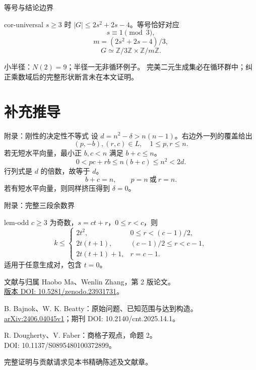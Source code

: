\documentclass{beamer}
\begin{document}
\begin{frame}{等号与结论边界}
\begin{bookresult}{cor-universal}
$s\ge3$ 时 $|G|\le2s^2+2s-4$。等号恰好对应
\[s\equiv1\pmod3,\]
\[m=(2s^2+2s-4)/3,\]
\[G\simeq\mathbb Z/3\mathbb Z\times\mathbb Z/m\mathbb Z.\]
\end{bookresult}
小半径：$N(2)=9$；半径一无非循环例子。
\medskip
完美二元生成集必在循环群中；纠正乘数域后的完整形状断言未在本文证明。
\end{frame}
\appendix
\section{补充推导}
\begin{frame}{附录：刚性的决定性不等式}
设 $d=n^2-\delta>n(n-1)$。右边外一列的覆盖给出
\[(p,-b),(r,c)\in L,\quad1\le p,r\le n.\]
若无短水平向量，最小正 $b,c<n$ 满足 $b+c\le n$。
\[0<pc+rb\le n(b+c)\le n^2<2d.\]
行列式是 $d$ 的倍数，故等于 $d$。
\[b+c=n,\qquad p=n\ \text{或}\ r=n.\]
若有短水平向量，则同样挤压得到 $\delta=0$。
\end{frame}
\begin{frame}{附录：完整三段余数界}
\begin{bookresult}{lem-odd}
$c\ge3$ 为奇数，$s=ct+r$，$0\le r<c$，则
\[k\le\begin{cases}
2t^2,&0\le r<(c-1)/2,\\
2t(t+1),&(c-1)/2\le r<c-1,\\
2t(t+1)+1,&r=c-1.
\end{cases}\]
适用于任意生成对，包含 $t=0$。
\end{bookresult}
\end{frame}
\begin{frame}{文献与归属}
\small
Haobo Ma、Wenlin Zhang，第 2 版论文。\\
\href{https://doi.org/10.5281/zenodo.23931731}{版本 DOI: 10.5281/zenodo.23931731}。
\medskip

B. Bajnok、W. K. Beatty：原始问题、已知范围与达到构造。\\
\href{https://arxiv.org/abs/2406.04045v1}{arXiv:2406.04045v1}；期刊 DOI: 10.2140/cnt.2025.14.1。
\medskip

R. Dougherty、V. Faber：商格子观点，命题 2。\\
DOI: 10.1137/S0895480100372899。
\medskip

完整证明与贡献请求见本书精确陈述及文献章。
\end{frame}
\FormalVerification
\end{document}
